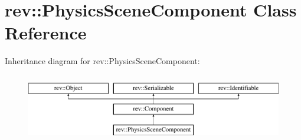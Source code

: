 \hypertarget{classrev_1_1_physics_scene_component}{}\section{rev\+::Physics\+Scene\+Component Class Reference}
\label{classrev_1_1_physics_scene_component}
Inheritance diagram for rev\+::Physics\+Scene\+Component\+:\begin{figure}[H]
\begin{center}
\leavevmode
\includegraphics[height=2.978723cm]{classrev_1_1_physics_scene_component}
\end{center}
\end{figure}
